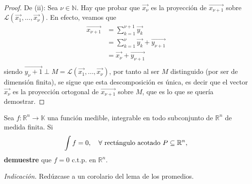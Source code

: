 \documentclass[12pt]{report}
\theoremstyle{largebreak}
\newcommand\cf[3]{\ensuremath{#1:#2\rightarrow#3}}
\begin{document}
\begin{proof}
        De (ii): Sea $\nu\in\mathbb{N}$. Hay que probar que $\vec{x_\nu}$ es la proyección de $\vec{x_{\nu+1}}$ sobre $\mathcal{L}(\vec{x_1},...,\vec{x_\nu})$. En efecto, veamos que
        \begin{equation*}
            \begin{split}
                \vec{x_{\nu+1}}&=\sum_{ k=1}^{\nu+1}\vec{y_{k}}\\
                &=\sum_{ k=1}^\nu\vec{y_{k}}+\vec{y_{\nu+1}} \\
                &=\vec{x_\nu}+\vec{y_{\nu+1}} \\
            \end{split}
        \end{equation*}
        siendo $\vec{y_\nu+1}\perp M=\mathcal{L}(\vec{x_1},...,\vec{x_\nu})$, por tanto al ser $M$ distinguido (por ser de dimensión finita), se sigue que esta descomposición es única, es decir que el vector $\vec{x_\nu}$ es la proyección ortogonal de $\vec{x_{\nu+1}}$ sobre $M$, que es lo que se quería demostrar.

    \end{proof}

    \begin{excer}
        Sea $\cf{f}{\mathbb{R}^n}{\mathbb{K}}$ una función medible, integrable en todo subconjunto de $\mathbb{R}^n$ de medida finita. Si
        \begin{equation*}
            \int f=0,\quad\forall\textup{ rectángulo acotado }P\subseteq\mathbb{R}^n,
        \end{equation*}
        \textbf{demuestre} que $f=0$ c.t.p. en $\mathbb{R}^n$.
        
        \textit{Indicación.} Redúzcase a un corolario del lema de los promedios.
    \end{excer}
\end{document}
